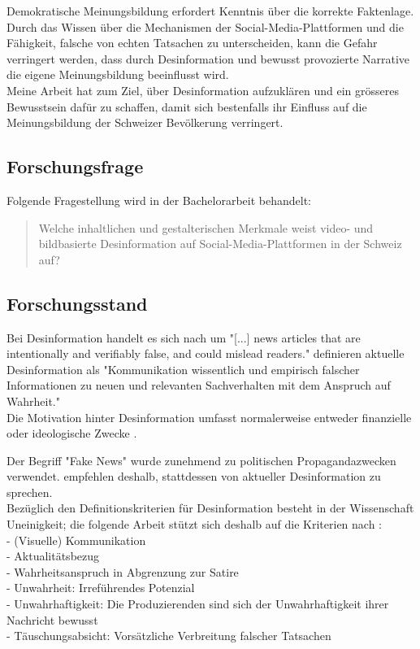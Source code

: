 \documentclass[12pt,a4paper]{article}        %
\begin{document}
Demokratische Meinungsbildung erfordert Kenntnis über die korrekte Faktenlage. Durch das Wissen über die Mechanismen der Social-Media-Plattformen und die Fähigkeit, falsche von echten Tatsachen zu unterscheiden, kann die Gefahr verringert werden, dass durch Desinformation und bewusst provozierte Narrative die eigene Meinungsbildung beeinflusst wird.\\
Meine Arbeit hat zum Ziel, über Desinformation aufzuklären und ein grösseres Bewusstsein dafür zu schaffen, damit sich bestenfalls ihr Einfluss auf die Meinungsbildung der Schweizer Bevölkerung verringert.

\subsection{Forschungsfrage}
Folgende Fragestellung wird in der Bachelorarbeit behandelt:\\

\begin{quote}
  Welche inhaltlichen und gestalterischen Merkmale weist video- und bildbasierte Desinformation auf Social-Media-Plattformen in der Schweiz auf?
\end{quote}

\subsection{Forschungsstand}

Bei Desinformation handelt es sich nach \textcite[213]{allcott_social_2017} um "[...] news articles that are intentionally and verifiably false, and could mislead readers." \textcite{marx_fake_2020} definieren aktuelle Desinformation als "Kommunikation wissentlich und empirisch falscher Informationen zu neuen und relevanten Sachverhalten mit dem Anspruch auf Wahrheit." \\
Die Motivation hinter Desinformation umfasst normalerweise entweder finanzielle oder ideologische Zwecke \parencites[vgl.][138]{tandoc_defining_2018}[225]{schmidt_meinungsbildung_2022}[154-155]{lange_unsicherheit_2019}.

Der Begriff "Fake News" wurde zunehmend zu politischen Propagandazwecken verwendet. \Textcite[148]{marx_fake_2020} empfehlen deshalb, stattdessen von aktueller Desinformation zu sprechen. \\
Bezüglich den Definitionskriterien für Desinformation besteht in der Wissenschaft Uneinigkeit; die folgende Arbeit stützt sich deshalb auf die Kriterien nach \textcite{marx_fake_2020}: \\
- (Visuelle) Kommunikation \\
- Aktualitätsbezug \\
- Wahrheitsanspruch in Abgrenzung zur Satire \\
- Unwahrheit: Irreführendes Potenzial \\
- Unwahrhaftigkeit: Die Produzierenden sind sich der Unwahrhaftigkeit ihrer Nachricht bewusst \\
- Täuschungsabsicht: Vorsätzliche Verbreitung falscher Tatsachen\\
\end{document}
